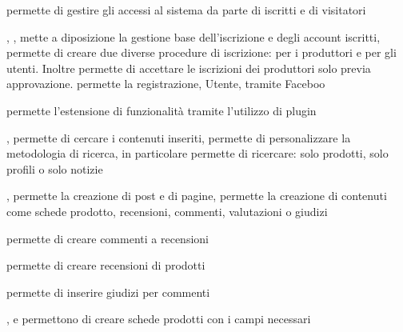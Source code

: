 
{}
{ permette di gestire gli accessi al sistema da parte di iscritti e di visitatori}


{, , }
{ mette a diposizione la gestione base dell'iscrizione e degli account iscritti,   permette di creare due diverse procedure di iscrizione: per i produttori e per gli utenti. Inoltre permette di accettare le iscrizioni dei produttori solo previa approvazione. permette la registrazione, Utente, tramite Faceboo}


{}
{ permette l'estensione di funzionalità tramite l'utilizzo di plugin}


{, }
{ permette di cercare i contenuti inseriti,  permette di personalizzare la metodologia di ricerca, in particolare permette di ricercare: solo prodotti, solo profili o solo notizie}


{, }
{ permette la creazione di post e di pagine,  permette la creazione di contenuti come schede prodotto, recensioni, commenti, valutazioni o giudizi}


{}
{ permette di creare commenti a recensioni}


{}
{ permette di creare recensioni di prodotti}


{}
{ permette di inserire giudizi per commenti}


{, }
{ e  permettono di creare schede prodotti con i campi necessari}

